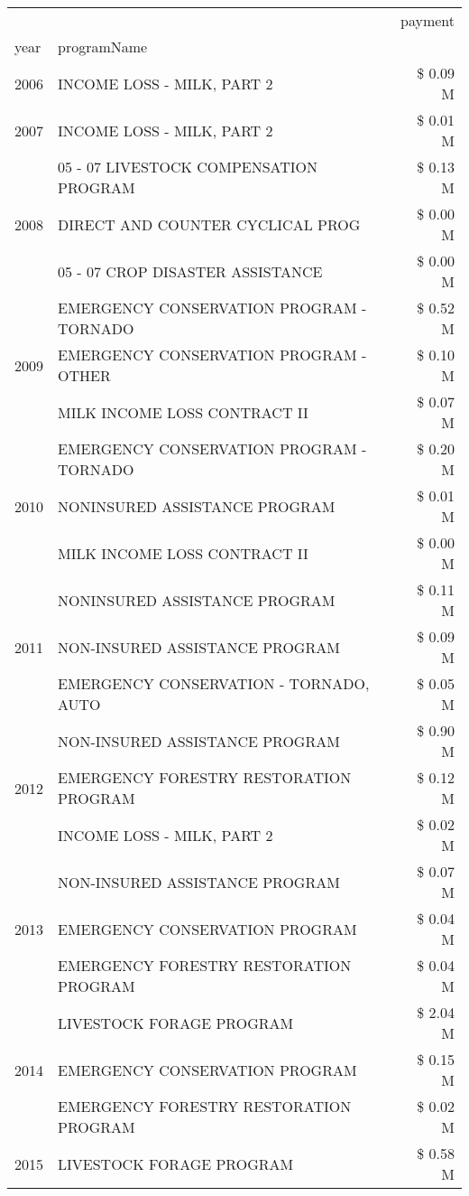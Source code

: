 \begin{tabular}{llr}
\toprule
 &  & payment \\
year & programName &  \\
\midrule
2006 & INCOME LOSS - MILK, PART 2 & \$ 0.09 M \\
\cline{1-3}
2007 & INCOME LOSS - MILK, PART 2 & \$ 0.01 M \\
\cline{1-3}
\multirow[t]{3}{*}{2008} & 05 - 07 LIVESTOCK COMPENSATION PROGRAM & \$ 0.13 M \\
 & DIRECT AND COUNTER CYCLICAL PROG & \$ 0.00 M \\
 & 05 - 07 CROP DISASTER ASSISTANCE & \$ 0.00 M \\
\cline{1-3}
\multirow[t]{3}{*}{2009} & EMERGENCY CONSERVATION PROGRAM - TORNADO & \$ 0.52 M \\
 & EMERGENCY CONSERVATION PROGRAM - OTHER & \$ 0.10 M \\
 & MILK INCOME LOSS CONTRACT II & \$ 0.07 M \\
\cline{1-3}
\multirow[t]{3}{*}{2010} & EMERGENCY CONSERVATION PROGRAM - TORNADO & \$ 0.20 M \\
 & NONINSURED ASSISTANCE PROGRAM & \$ 0.01 M \\
 & MILK INCOME LOSS CONTRACT II & \$ 0.00 M \\
\cline{1-3}
\multirow[t]{3}{*}{2011} & NONINSURED ASSISTANCE PROGRAM & \$ 0.11 M \\
 & NON-INSURED ASSISTANCE PROGRAM & \$ 0.09 M \\
 & EMERGENCY CONSERVATION - TORNADO, AUTO & \$ 0.05 M \\
\cline{1-3}
\multirow[t]{3}{*}{2012} & NON-INSURED ASSISTANCE PROGRAM & \$ 0.90 M \\
 & EMERGENCY FORESTRY RESTORATION PROGRAM & \$ 0.12 M \\
 & INCOME LOSS - MILK, PART 2 & \$ 0.02 M \\
\cline{1-3}
\multirow[t]{3}{*}{2013} & NON-INSURED ASSISTANCE PROGRAM & \$ 0.07 M \\
 & EMERGENCY CONSERVATION PROGRAM & \$ 0.04 M \\
 & EMERGENCY FORESTRY RESTORATION PROGRAM & \$ 0.04 M \\
\cline{1-3}
\multirow[t]{3}{*}{2014} & LIVESTOCK FORAGE PROGRAM & \$ 2.04 M \\
 & EMERGENCY CONSERVATION PROGRAM & \$ 0.15 M \\
 & EMERGENCY FORESTRY RESTORATION PROGRAM & \$ 0.02 M \\
\cline{1-3}
\multirow[t]{2}{*}{2015} & LIVESTOCK FORAGE PROGRAM & \$ 0.58 M \\

\end{tabular}
